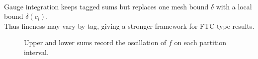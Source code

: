 \begin{perspective} \label{per:gauge-integral-context} \\
Gauge integration keeps tagged sums but replaces one mesh bound $\delta$ with a local bound $\delta(c_i)$.\\
Thus fineness may vary by tag, giving a stronger framework for FTC-type results.
\end{perspective}

\begin{figure}[H]
  \centering
  
  \caption{Upper and lower sums record the oscillation of $f$ on each partition interval.}
  \label{fig:riemann-upper-lower-partition}
\end{figure}

